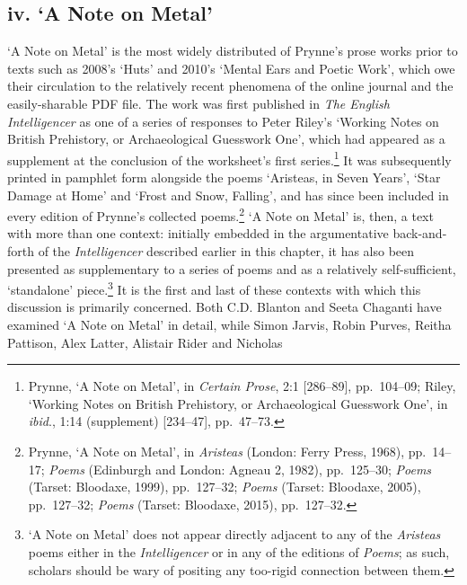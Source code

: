 \documentclass[]{article}
\begin{document}
\subsection{\texorpdfstring{iv. `A Note on
Metal'}{iv. A Note on Metal}}\label{iv.-a-note-on-metal}

`A Note on Metal' is the most widely distributed of Prynne's prose works
prior to texts such as 2008's `Huts' and 2010's `Mental Ears and Poetic
Work', which owe their circulation to the relatively recent phenomena of
the online journal and the easily-sharable PDF file. The work was first
published in \emph{The English Intelligencer} as one of a series of
responses to Peter Riley's `Working Notes on British Prehistory, or
Archaeological Guesswork One', which had appeared as a supplement at the
conclusion of the worksheet's first series.\footnote{Prynne, `A Note on
  Metal', in \emph{Certain Prose}, 2:1 {[}286--89{]}, pp.~104--09;
  Riley, `Working Notes on British Prehistory, or Archaeological
  Guesswork One', in \emph{ibid}., 1:14 (supplement) {[}234--47{]},
  pp.~47--73.} It was subsequently printed in pamphlet form alongside
the poems `Aristeas, in Seven Years', `Star Damage at Home' and `Frost
and Snow, Falling', and has since been included in every edition of
Prynne's collected poems.\footnote{Prynne, `A Note on Metal', in
  \emph{Aristeas} (London: Ferry Press, 1968), pp.~14--17; \emph{Poems}
  (Edinburgh and London: Agneau 2, 1982), pp.~125--30; \emph{Poems}
  (Tarset: Bloodaxe, 1999), pp.~127--32; \emph{Poems} (Tarset: Bloodaxe,
  2005), pp.~127--32; \emph{Poems} (Tarset: Bloodaxe, 2015),
  pp.~127--32.} `A Note on Metal' is, then, a text with more than one
context: initially embedded in the argumentative back-and-forth of the
\emph{Intelligencer} described earlier in this chapter, it has also been
presented as supplementary to a series of poems and as a relatively
self-sufficient, `standalone' piece.\footnote{`A Note on Metal' does not
  appear directly adjacent to any of the \emph{Aristeas} poems either in
  the \emph{Intelligencer} or in any of the editions of \emph{Poems}; as
  such, scholars should be wary of positing any too-rigid connection
  between them.} It is the first and last of these contexts with which
this discussion is primarily concerned. Both C.D. Blanton and Seeta
Chaganti have examined `A Note on Metal' in detail, while Simon Jarvis,
Robin Purves, Reitha Pattison, Alex Latter, Alistair Rider and Nicholas
\end{document}
